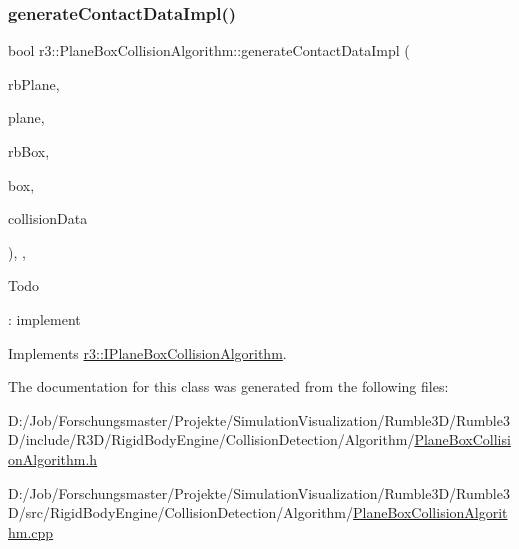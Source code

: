 \subsubsection{\texorpdfstring{generate\+Contact\+Data\+Impl()}{generateContactDataImpl()}}
{\footnotesize\ttfamily bool r3\+::\+Plane\+Box\+Collision\+Algorithm\+::generate\+Contact\+Data\+Impl (\begin{DoxyParamCaption}\item[{\mbox{\hyperlink{classr3_1_1_rigid_body}{Rigid\+Body}} $\ast$}]{rb\+Plane,  }\item[{\mbox{\hyperlink{classr3_1_1_collision_plane}{Collision\+Plane}} $\ast$}]{plane,  }\item[{\mbox{\hyperlink{classr3_1_1_rigid_body}{Rigid\+Body}} $\ast$}]{rb\+Box,  }\item[{\mbox{\hyperlink{classr3_1_1_collision_box}{Collision\+Box}} $\ast$}]{box,  }\item[{\mbox{\hyperlink{classr3_1_1_collision_data}{Collision\+Data}} \&}]{collision\+Data }\end{DoxyParamCaption})\hspace{0.3cm}{\ttfamily [override]}, {\ttfamily [protected]}, {\ttfamily [virtual]}}

\begin{DoxyRefDesc}{Todo}
\item[\mbox{\hyperlink{todo__todo000006}{Todo}}]\+: implement \end{DoxyRefDesc}


Implements \mbox{\hyperlink{classr3_1_1_i_plane_box_collision_algorithm_a48f6ca7613a0cc7c64d8e0cfe34674e8}{r3\+::\+I\+Plane\+Box\+Collision\+Algorithm}}.



The documentation for this class was generated from the following files\+:\begin{DoxyCompactItemize}
\item 
D\+:/\+Job/\+Forschungsmaster/\+Projekte/\+Simulation\+Visualization/\+Rumble3\+D/\+Rumble3\+D/include/\+R3\+D/\+Rigid\+Body\+Engine/\+Collision\+Detection/\+Algorithm/\mbox{\hyperlink{_plane_box_collision_algorithm_8h}{Plane\+Box\+Collision\+Algorithm.\+h}}\item 
D\+:/\+Job/\+Forschungsmaster/\+Projekte/\+Simulation\+Visualization/\+Rumble3\+D/\+Rumble3\+D/src/\+Rigid\+Body\+Engine/\+Collision\+Detection/\+Algorithm/\mbox{\hyperlink{_plane_box_collision_algorithm_8cpp}{Plane\+Box\+Collision\+Algorithm.\+cpp}}\end{DoxyCompactItemize}
